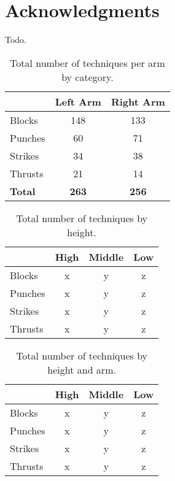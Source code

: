 \documentclass[10pt,twocolumn,a4paper]{article}
\begin{document}
\section*{Acknowledgments}

  Todo.




\begin{table}
  \centering
  \begin{tabular}{l|c|c} \hline \hline
    & Left Arm & Right Arm \\ \hline

    Blocks    & 148   & 133 \\
    Punches   &  60   &  71 \\
    Strikes   &  34   &  38 \\
    Thrusts   &  21   &  14 \\
    \hline

    \textbf{Total}   & \textbf{263}   & \textbf{256} \\
    \hline
  \end{tabular}
  \caption{Total number of techniques per arm by category.}
  \end{table}


\begin{table}
  \centering
  \begin{tabular}{l|c|c|c} \hline \hline
    & High & Middle & Low \\ \hline

    Blocks    & x   & y   & z \\
    Punches   & x   & y   & z \\
    Strikes   & x   & y   & z \\
    Thrusts   & x   & y   & z \\
    \hline

  \end{tabular}
  \caption{Total number of techniques by height.}
  \end{table}


\begin{table}
  \centering
  \begin{tabular}{l|c|c|c} \hline \hline
    & High & Middle & Low \\ \hline

    Blocks    & x   & y   & z \\
    Punches   & x   & y   & z \\
    Strikes   & x   & y   & z \\
    Thrusts   & x   & y   & z \\
    \hline

  \end{tabular}
  \caption{Total number of techniques by height and arm.}
  \end{table}
\end{document}
